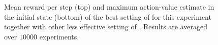 \documentclass[conference]{IEEEtran}
\begin{document}
\begin{figure}[t]
\begin{minipage}{\columnwidth}
\end{minipage}
  \caption{Mean reward per step (top) and maximum action-value estimate in the initial state (bottom) of the best setting of \alg for this experiment together with other less effective setting of \alg. Results are averaged over $10000$ experiments.}
  \label{F:hasselt_QDecs}
\end{figure}

\begin{figure}[t]
\begin{minipage}{\textwidth}
\centering

\end{minipage}
\end{figure}
\end{document}
